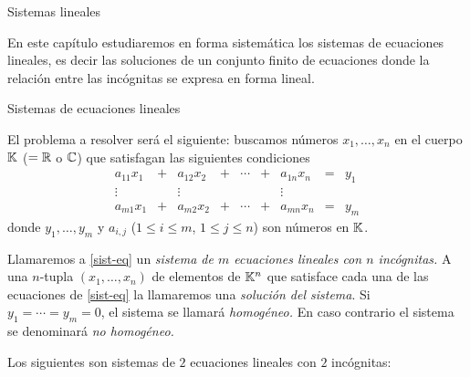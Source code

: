 
    \begin{chapter}{Sistemas lineales}\label{chap-sist-lin}
        
        En  este capítulo estudiaremos en forma sistemática los sistemas de ecuaciones lineales,  es decir las soluciones de un conjunto finito de ecuaciones  donde la relación entre las incógnitas se expresa en forma lineal.  
        
        
        \begin{section}{Sistemas de ecuaciones lineales}\label{seccion-sistemas-de-ecuaciones-lineales}
  
        
            El problema a resolver será el siguiente: buscamos números  $x_1,\ldots,x_n$ en el cuerpo $\mathbb K$ ($= \mathbb R$ o $\mathbb C$)  que satisfagan las siguientes condiciones
            \begin{equation}\label{sist-eq}
            \begin{matrix}
            a_{11}x_1& + &a_{12}x_2& + &\cdots& + &a_{1n}x_n &= &y_1\\
            \vdots&  &\vdots& &&  &\vdots \\
            a_{m1}x_1& + &a_{m2}x_2& + &\cdots& + &a_{mn}x_n &=&y_m
            \end{matrix}
            \end{equation}
            donde $y_1, \ldots,y_m$ y $a_{i,j}$ ($1 \le i \le m$, $1 \le j \le n$) son números en $\mathbb K$.
            
            Llamaremos a \eqref{sist-eq} un \textit{sistema de $m$ ecuaciones lineales con $n$ incógnitas.} A una  $n$-tupla $(x_1,\ldots,x_n)$ de elementos de $\mathbb K^n$ que satisface cada una de las ecuaciones de  \eqref{sist-eq} la llamaremos una \textit{solución del sistema}. Si $y_1 = \cdots = y_m=0$, el sistema se llamará \textit{homogéneo.} En caso contrario el sistema se denominará \textit{no homogéneo.}

            \begin{ejemplo*}
                Los siguientes son sistemas de $2$ ecuaciones lineales con $2$ incógnitas:
                

\end{ejemplo*}
\end{section}
\end{chapter}
